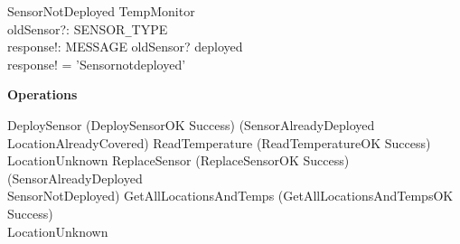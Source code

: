 \documentclass[12pt]{article}
\begin{document}
\begin{schema}{SensorNotDeployed}
\Xi TempMonitor \\
oldSensor?: SENSOR\verb|_|TYPE \\
response!: MESSAGE
\where
oldSensor? \notin deployed \\
response! = 'Sensor\hspace{0.15cm}not\hspace{0.15cm}deployed'
\end{schema}

\textbf{Operations}
\begin{zed}
DeploySensor \simeq (DeploySensorOK \land Success) \lor (SensorAlreadyDeployed \\ \lor LocationAlreadyCovered) 
\also 
ReadTemperature \simeq (ReadTemperatureOK \land Success) \lor LocationUnknown
\also 
ReplaceSensor \simeq (ReplaceSensorOK \land Success) \lor (SensorAlreadyDeployed \lor \\ SensorNotDeployed)
\also 
GetAllLocationsAndTemps \simeq (GetAllLocationsAndTempsOK \land Success) \lor \\ LocationUnknown
\end{zed}
\end{document}
